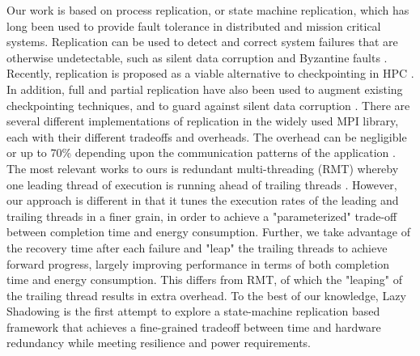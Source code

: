 Our work is based on process replication, or state machine replication, which has long been used to provide fault tolerance in distributed and mission critical systems\cite{schneider_1990_tutorial,bartlett_1981_nonstop}. Replication can be used to detect and correct system failures that are otherwise undetectable,
such as silent data corruption \cite{ni_2013_acr} and Byzantine faults \cite{fiala_2012_sdc}. Recently, replication is proposed as a
viable alternative to checkpointing in HPC \cite{riesen_sandia_2010,lefray_2013_rsd,Cappello:09:Fault}. 
In addition, full and partial
replication have also been used to augment existing checkpointing techniques, and to guard
against silent data corruption \cite{stearly_2012_partial,elliott_2012_cpr}. There are several different implementations of
replication in the widely used MPI library, each with their different tradeoffs and overheads. The
overhead can be negligible or up to 70\% depending upon the communication patterns of the
application \cite{engelmann2011redundant}. %
The most relevant works to ours is redundant multi-threading (RMT) whereby one leading thread of execution is running ahead of trailing threads \cite{reinhardt2000transient,Wadden:2014:RDE:2665671.2665686}. However, our approach is different in that it tunes the execution rates of the leading and trailing threads in a finer grain, in order to achieve a "parameterized" trade-off between completion time and energy consumption. Further, we take advantage of the recovery time after each failure and "leap" the trailing threads to achieve forward progress, largely improving performance in terms of both completion time and energy consumption. This differs from RMT, of which the "leaping" of the trailing thread results in extra overhead.
To the best of our knowledge,
Lazy Shadowing is the first attempt to explore a state-machine replication based framework
that achieves a fine-grained tradeoff between time and hardware redundancy while meeting resilience and
power requirements.
